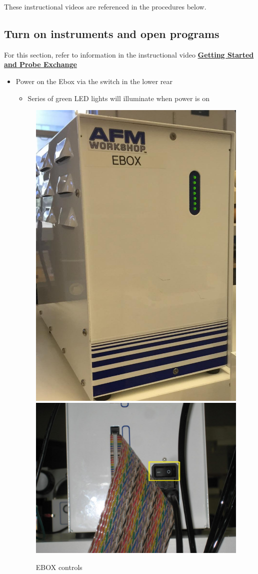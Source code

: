 \documentclass{../lab}
\begin{document}
These instructional videos are referenced in the procedures below.

\subsection{Turn on instruments and open programs}
\label{subsec:TurnOnInstrumentsAndOpenPrograms}

For this section, refer to information in the instructional video  \href{http://experimentationlab.berkeley.edu/sites/default/files/gettingstarted\_final2.mp4}{\textbf{Getting Started and Probe Exchange}}

\begin{itemize}
    \item Power on the Ebox via the switch in the lower rear
    \begin{itemize}
        \item Series of green LED lights will illuminate when power is on
    \end{itemize}
    
    \begin{figure}[H]
        \centering
        \href{http://experimentationlab.berkeley.edu/sites/default/files/EBOX2.jpg}{\includegraphics[height=0.47\linewidth,keepaspectratio]{images/EBOX2.jpg}}
        \href{http://experimentationlab.berkeley.edu/sites/default/files/AFMImages/10.JPG}{\includegraphics[height=0.47\linewidth,keepaspectratio]{images/10.JPG}}
        \caption{EBOX controls}
    \end{figure}


\end{itemize}
\end{document}
